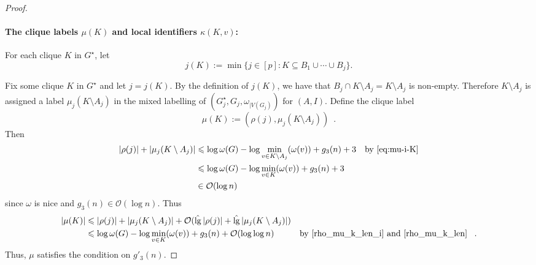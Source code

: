 \documentclass{patmorin}
\let\eqref\cref
\renewcommand{\le}{\leqslant}
\newcommand{\pat}[1]{\noindent\textcolor{Magenta}{PaMo: #1}}
\newcommand{\piotr}[1]{\noindent\textcolor{red}{PiMi: #1}}
\DeclareMathOperator{\lgg}{\hat{lg}}
\newcommand{\Oh}{\calO}
\newcommand{\calK}{\mathcal{K}}
\newcommand{\calO}{\mathcal{O}}
\begin{document}
\begin{proof}
    \paragraph{\boldmath The clique labels $\mu(K)$ and local identifiers $\kappa(K,v)$:}
    For each clique $K$ in $G^\star$, 
    let
    \[
      j(K):=\min\{j\in[p]:K\subseteq B_1\cup\cdots\cup B_j\}.
    \]

    Fix some clique $K$ in $G^\star$  and let $j=j(K)$.  By the definition of $j(K)$, we have that $B_j\cap K\setminus A_j=K\setminus A_j$ is non-empty.      
    Therefore $K\setminus A_j$ is assigned a label $\mu_j(K\setminus A_j)$ in the mixed labelling of $(G^\star_j,G_j,\omega_{|V(G_j)})$ for $(A,I)$.
    Define the clique label
    \[
        \mu(K):=(\rho(j),\mu_j(K\setminus A_j)) \enspace .
    \]
    Then
    \begin{align}
       |\rho(j)|+|\mu_j(K\setminus A_j)|
       & \le \log\omega(G)-\log\min_{v\in K\setminus A_j}(\omega(v))+g_3(n)+3 &\textrm{by~\eqref{eq:mu-i-K}} \\
       & \le \log\omega(G)-\log\min_{v\in K}(\omega(v))+g_3(n)+3   \label{rho_mu_k_len_i} \\
       & \in \Oh(\log n)
       \label{rho_mu_k_len}
    \end{align}
    since $\omega$ is nice and $g_3(n)\in\Oh(\log n)$.  Thus
    \begin{align*}
        |\mu(K)|
        & \le |\rho(j)|+|\mu_j(K\setminus A_j)| + \Oh(\lgg|\rho(j)|+\lgg|\mu_j(K\setminus A_j)|) \\
        & \le \log\omega(G)-\log\min_{v\in K}(\omega(v)) + g_3(n)+\Oh(\log\log n) & \text{by \eqref{rho_mu_k_len_i} and \eqref{rho_mu_k_len} } \enspace .
    \end{align*}
    Thus, $\mu$ satisfies the condition on $g'_3(n)$.


\end{proof}
\end{document}
